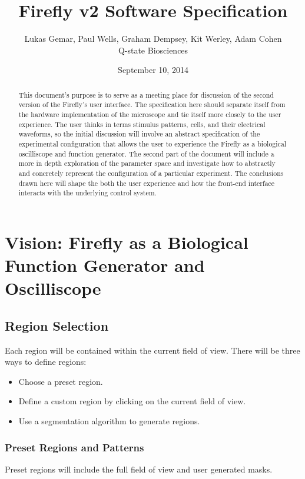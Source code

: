 \documentclass[a4paper,12pt]{article}
\begin{document}
\title{Firefly v2 Software Specification}
\author{Lukas Gemar, Paul Wells, Graham Dempsey, Kit Werley, Adam Cohen\\
		Q-state Biosciences}
\date{September 10, 2014}
\maketitle

\begin{abstract}
This document's purpose is to serve as a meeting place for discussion of
the second version of the Firefly's user interface. The specification here
should separate itself from the hardware implementation of the microscope
and tie itself more closely to the user experience. The user thinks in terms
stimulus patterns, cells, and their electrical waveforms, so the initial 
discussion will involve an abstract specification of the experimental configuration 
that allows the user to experience the Firefly as a biological oscilliscope 
and function generator. The second part of the document will include a more 
in depth exploration of the parameter space and investigate how to 
abstractly and concretely represent the configuration of a particular 
experiment. The conclusions drawn here will shape the both the user 
experience and how the front-end interface interacts with the underlying 
control system.
\end{abstract}
\section{Vision: Firefly as a Biological Function Generator and Oscilliscope}
\subsection{Region Selection}
Each region will be contained within the current field of view. 
There will be three ways to define regions:
\begin{itemize}
 \item Choose a preset region.
 \item Define a custom region by clicking on the current field of view.
 \item Use a segmentation algorithm to generate regions.
\end{itemize}
\subsubsection{Preset Regions and Patterns}
Preset regions will include the full field of view and user generated masks.
\end{document}
